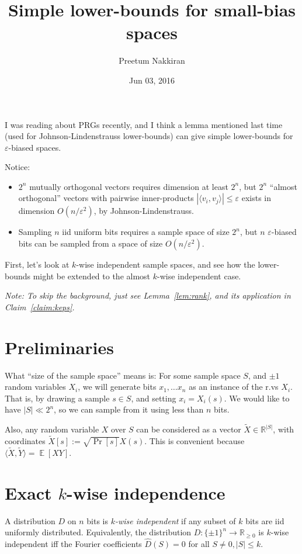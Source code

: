\documentclass[]{article}
\title{Simple lower-bounds for small-bias spaces}
\author{Preetum Nakkiran}
\date{Jun 03, 2016}
\newcommand{\1}{\mathbb{1}}
\newcommand{\R}{\mathbb{R}}
\newcommand{\E}{\mathop{\mathbb{E}}}
\renewcommand{\epsilon}{\varepsilon}
\newcommand{\innp}[1]{\langle #1 \rangle}
\renewcommand{\t}{\widetilde}
\begin{document}
\maketitle

I was reading about PRGs recently, and I think a lemma mentioned last time
(used for Johnson-Lindenstrauss lower-bounds) can give simple lower-bounds for
$\epsilon$-biased spaces.

Notice:
\begin{itemize}
    \item $2^n$ mutually orthogonal vectors requires dimension at least $2^n$, but
        $2^n$ ``almost orthogonal'' vectors with pairwise inner-products
        $|\innp{v_i, v_j}| \leq \epsilon$ exists in dimension
        $O(n/\epsilon^2)$, by Johnson-Lindenstrauss.
    \item Sampling $n$ iid uniform bits requires a sample space of size
        $2^n$, but $n$ $\epsilon$-biased bits can be sampled from a space of
        size $O(n/\epsilon^2)$.
\end{itemize}

First, let's look at $k$-wise independent sample spaces, and see how the
lower-bounds might be extended to the almost $k$-wise independent case.

{\it Note: To skip the background, just see Lemma~\ref{lem:rank},
and its application in Claim~\ref{claim:keps}.
}

\section{Preliminaries}
What ``size of the sample space'' means is:
For some sample space $S$, and $\pm 1$ random variables $X_i$,
we will generate bits $x_1, \dots x_n$ as an instance of the r.vs $X_i$.
That is, by drawing a sample $s \in S$, and setting $x_i = X_i(s)$.
We would like to have $|S| \ll 2^n$, so we can sample from it using less than $n$ bits.

Also, any random variable $X$ over $S$ can be considered as a vector
$\t X \in \R^{|S|}$, with coordinates $\t X[s] := \sqrt{\Pr[s]} X(s)$.
This is convenient because $\innp{\t X, \t Y} = \E[XY]$.


\section{Exact $k$-wise independence}
\label{sec:kwise}
A distribution $D$ on $n$ bits is \emph{$k$-wise independent} if any subset of $k$ bits are iid
uniformly distributed.
Equivalently, the distribution $D : \{\pm 1\}^n \to \R_{\geq 0}$ is $k$-wise independent iff the Fourier coefficients
$\hat D(S) = 0$ for all $S \neq 0, |S| \leq k$.
\end{document}
